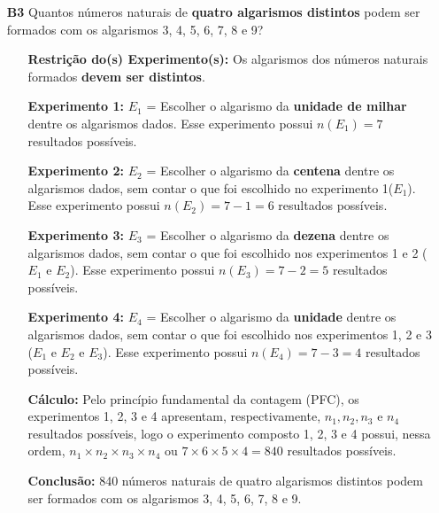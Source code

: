 \documentclass[a4paper,12pt]{article}
\begin{document}
\begin{enumerate}
\item[\textbf{B3}] Quantos números naturais de \textbf{quatro algarismos distintos} podem ser formados com os algarismos 3, 4, 5, 6, 7, 8 e 9?
 \begin{itemize}
     \item[\ding{172}] \textbf{Restrição do(s) Experimento(s):} Os algarismos dos números naturais formados \textbf{devem ser distintos}.
     \item[\ding{173}] \textbf{Experimento 1:} $E_1$ = Escolher o algarismo da \textbf{unidade de milhar} dentre os algarismos dados. Esse experimento possui $n(E_1) = 7$ resultados possíveis.
     \item[\ding{174}] \textbf{Experimento 2:} $E_2$ = Escolher o algarismo da \textbf{centena} dentre os algarismos dados, sem contar o que foi escolhido no experimento 1($E_1$). Esse experimento possui $n(E_2) = 7 - 1 = 6$ resultados possíveis.
     \item[\ding{175}] \textbf{Experimento 3:} $E_3$ = Escolher o algarismo da \textbf{dezena} dentre os algarismos dados, sem contar o que foi escolhido nos experimentos 1 e 2 ($E_1 \textrm{ e }E_2$). Esse experimento possui $n(E_3) = 7 - 2 = 5$ resultados possíveis.
     \item[\ding{176}] \textbf{Experimento 4:} $E_4$ = Escolher o algarismo da \textbf{unidade} dentre os algarismos dados, sem contar o que foi escolhido nos experimentos 1, 2 e 3 ($E_1 \textrm{ e } E_2 \textrm{ e } E_3$). Esse experimento possui $n(E_4) = 7 - 3 = 4$ resultados possíveis.    
     \item[\ding{177}] \textbf{Cálculo:} Pelo princípio fundamental da contagem (PFC), os experimentos 1, 2, 3 e 4 apresentam, respectivamente, $n_{1}, n_{2}, n_{3} \textrm{ e } n_{4}$ resultados possíveis, logo o experimento composto 1, 2, 3 e 4 possui, nessa ordem, $n_{1} \times n_{2} \times n_{3} \times n_{4}$ ou $7 \times 6 \times 5 \times 4 = 840$ resultados possíveis.
     \item[\ding{178}] \textbf{Conclusão:} 840 números naturais de quatro algarismos distintos podem ser formados com os algarismos 3, 4, 5, 6, 7, 8 e 9. 
   \end{itemize}


\end{enumerate}
\end{document}
